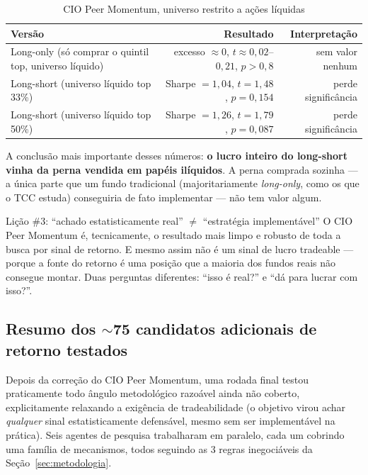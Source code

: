 \documentclass[11pt,a4paper]{article}
\begin{document}
\begin{table}[H]\centering\small
\caption{CIO Peer Momentum, universo restrito a ações líquidas}
\begin{tabular}{@{}p{6.5cm}rr@{}}
\toprule
Versão & Resultado & Interpretação \\
\midrule
Long-only (só comprar o quintil top, universo líquido) &
excesso $\approx 0$, $t\approx 0{,}02$--$0{,}21$, $p>0{,}8$ &
sem valor nenhum \\
Long-short (universo líquido top 33\%) &
Sharpe $=1{,}04$, $t=1{,}48$, $p=0{,}154$ &
perde significância \\
Long-short (universo líquido top 50\%) &
Sharpe $=1{,}26$, $t=1{,}79$, $p=0{,}087$ &
perde significância \\
\bottomrule
\end{tabular}
\end{table}

A conclusão mais importante desses números: \textbf{o lucro inteiro do
long-short vinha da perna vendida em papéis ilíquidos}. A perna comprada
sozinha --- a única parte que um fundo tradicional (majoritariamente
\emph{long-only}, como os que o TCC estuda) conseguiria de fato
implementar --- não tem valor algum.

\begin{licao}{Lição \#3: ``achado estatisticamente real'' $\neq$ ``estratégia implementável''}
O CIO Peer Momentum é, tecnicamente, o resultado mais limpo e robusto de
toda a busca por sinal de retorno. E mesmo assim não é um sinal de lucro
tradeable --- porque a fonte do retorno é uma posição que a maioria dos
fundos reais não consegue montar. Duas perguntas diferentes: ``isso é
real?'' e ``dá para lucrar com isso?''.
\end{licao}

\subsection{Resumo dos $\sim$75 candidatos adicionais de retorno testados}

Depois da correção do CIO Peer Momentum, uma rodada final testou
praticamente todo ângulo metodológico razoável ainda não coberto,
explicitamente relaxando a exigência de tradeabilidade (o objetivo virou
achar \emph{qualquer} sinal estatisticamente defensável, mesmo sem ser
implementável na prática). Seis agentes de pesquisa trabalharam em
paralelo, cada um cobrindo uma família de mecanismos, todos seguindo as 3
regras inegociáveis da Seção~\ref{sec:metodologia}.
\end{document}
